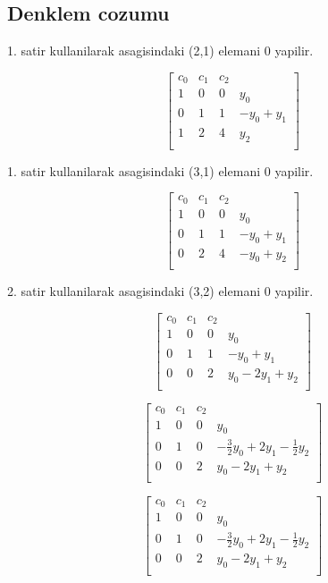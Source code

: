 \documentclass{article}
\begin{document}
\subsection{Denklem cozumu}
1. satir kullanilarak  asagisindaki (2,1) elemani 0 yapilir.\begin{center}
$$ \left[\begin{array}{rrr|r}
c_{0} & c_{1} & c_{2}\\
1 & 0 & 0 & y_{0}\\
0 & 1 & 1 & -y_{0}+y_{1}\\
1 & 2 & 4 & y_{2}\\
\end{array}\right] $$
\end{center}
1. satir kullanilarak  asagisindaki (3,1) elemani 0 yapilir.\begin{center}
$$ \left[\begin{array}{rrr|r}
c_{0} & c_{1} & c_{2}\\
1 & 0 & 0 & y_{0}\\
0 & 1 & 1 & -y_{0}+y_{1}\\
0 & 2 & 4 & -y_{0}+y_{2}\\
\end{array}\right] $$
\end{center}
2. satir kullanilarak  asagisindaki (3,2) elemani 0 yapilir.\begin{center}
$$ \left[\begin{array}{rrr|r}
c_{0} & c_{1} & c_{2}\\
1 & 0 & 0 & y_{0}\\
0 & 1 & 1 & -y_{0}+y_{1}\\
0 & 0 & 2 & y_{0}-2y_{1}+y_{2}\\
\end{array}\right] $$
\end{center}
\begin{center}
$$ \left[\begin{array}{rrr|r}
c_{0} & c_{1} & c_{2}\\
1 & 0 & 0 & y_{0}\\
0 & 1 & 0 & -\frac{3}{2}y_{0}+2y_{1}-\frac{1}{2}y_{2}\\
0 & 0 & 2 & y_{0}-2y_{1}+y_{2}\\
\end{array}\right] $$
\end{center}
\begin{center}
$$ \left[\begin{array}{rrr|r}
c_{0} & c_{1} & c_{2}\\
1 & 0 & 0 & y_{0}\\
0 & 1 & 0 & -\frac{3}{2}y_{0}+2y_{1}-\frac{1}{2}y_{2}\\
0 & 0 & 2 & y_{0}-2y_{1}+y_{2}\\
\end{array}\right] $$
\end{center}
\end{document}
